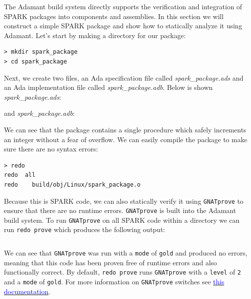 The Adamant build system directly supports the verification and integration of SPARK packages into components and assemblies. In this section we will construct a simple SPARK package and show how to statically analyze it using Adamant. Let's start by making a directory for our package:

\vspace{5mm} %
\begin{verbatim}
> mkdir spark_package 
> cd spark_package 
\end{verbatim}
\vspace{5mm} %

Next, we create two files, an Ada specification file called \textit{spark\_package.ads} and an Ada implementation file called \textit{spark\_package.adb}. Below is shown \textit{spark\_package.ads}:


and \textit{spark\_package.adb}:


We can see that the package contains a single procedure which safely increments an integer without a fear of overflow. We can easily compile the package to make sure there are no syntax errors:

\vspace{5mm} %
\begin{verbatim}
> redo
redo  all
redo    build/obj/Linux/spark_package.o
\end{verbatim}
\vspace{5mm} %

Because this is SPARK code, we can also statically verify it using \texttt{GNATprove} to ensure that there are no runtime errors. \texttt{GNATprove} is built into the Adamant build system. To run \texttt{GNATprove} on all SPARK code within a directory we can run \texttt{redo prove} which produces the following output:

\vspace{5mm} %
\inputminted{text}{../example_architecture/spark_package_no_config/output.txt}
\vspace{5mm} %

We can see that \texttt{GNATprove} was run with a \texttt{mode} of \texttt{gold} and produced no errors, meaning that this code has been proven free of runtime errors and also functionally correct. By default, \texttt{redo prove} runs \texttt{GNATprove} with a \texttt{level} of \texttt{2} and a \texttt{mode} of \texttt{gold}. For more information on \texttt{GNATprove} switches see \href{https://docs.adacore.com/spark2014-docs/html/ug/en/source/how_to_run_gnatprove.html#running-gnatprove-from-the-command-line}{\textcolor{blue}{this documentation}}. \\

